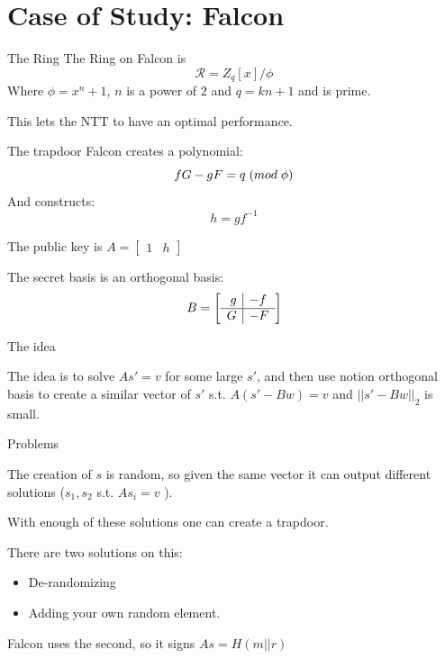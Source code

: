 \documentclass[presentation]{beamer}
\begin{document}
\section{Case of Study: Falcon}
\begin{frame}[label=the-ring]{The Ring}
  The Ring on Falcon \cite{falcon20} is
  \[
    \mathcal R = Z_q[x] / \phi
  \]
  Where \(\phi = x^n + 1\), \(n\) is a power of \(2\) and 
  \(q = kn + 1\) and is prime.

  This lets the NTT to have an optimal performance. 
\end{frame}
\begin{frame}[label=the-trapdoor]{The trapdoor}
  Falcon creates a polynomial:
  \[
    fG - gF = q \; \text({mod } \;\phi \text{)}
  \]
  And constructs:
  \[
    h = gf^{-1}
  \]

  The public key is 
  $A = \left[ \begin{array}{r|l} 1 &h\end{array} \right]$

  The secret basis is an orthogonal basis:
  \[
    B = \left[
      \begin{array}{r | l}
        g &-f\\
        \hline
        G &-F
      \end{array}
    \right]
  \]

\end{frame}

\begin{frame}[label=the-idea]{The idea}

  The idea is to solve \(As' = v\) for some large \(s'\), and
  then use notion orthogonal basis to create a similar vector of
  \(s'\) s.t.  \(A(s' -Bw) = v\) and \(||s' - Bw||_2\) is small.

\end{frame}
\begin{frame}[label=problems]{Problems}

  The creation of \(s\) is random, so given the same vector
  it \alert{can} output different solutions (\(s_1, s_2\)
  s.t. \(As_i = v\) ).

  With enough of these solutions one can create a trapdoor.

  There are two solutions on this:

  \begin{itemize}
    \item De-randomizing
    \item Adding your own random element.
  \end{itemize}

  Falcon uses the second, so it signs \(As = H(m || r)\)

\end{frame}
\end{document}
